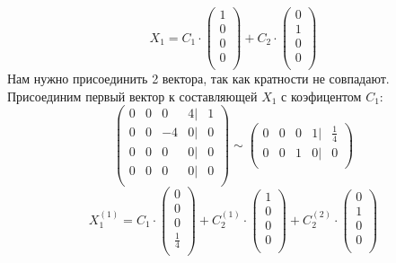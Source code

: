 \documentclass{article}
\begin{document}
\begin{equation*}
    X_1=C_1\cdot 
    \begin{pmatrix}
        1 \\
        0 \\
        0 \\
        0 \\
    \end{pmatrix}+
    C_2
    \cdot
    \begin{pmatrix}
        0 \\
        1 \\
        0 \\
        0 \\
    \end{pmatrix}
\end{equation*}
Нам нужно присоединить 2 вектора, так как кратности не совпадают.\\
Присоединим первый вектор к составляющей $X_1$ с коэфицентом $C_1$:
\begin{equation*}
    \begin{pmatrix}
        0 & 0 & 0 & 4|&1 \\
        0 & 0 & -4 & 0|&0 \\
        0 & 0 & 0 & 0|&0 \\
        0 & 0 & 0 & 0|&0 \\
        \end{pmatrix}\sim 
        \begin{pmatrix}
            0 & 0 & 0 & 1|&\frac{1}{4} \\
            0 & 0 & 1 & 0|&0 \\
        \end{pmatrix}
\end{equation*}
\begin{equation*}
    X^{(1)}_1=C_1\cdot 
    \begin{pmatrix}
        0 \\
        0 \\
        0 \\
        \frac{1}{4} \\
    \end{pmatrix}+
    C^{(1)}_2\cdot 
    \begin{pmatrix}
        1 \\
        0 \\
        0 \\
        0 \\
    \end{pmatrix}+
    C^{(2)}_2\cdot 
    \begin{pmatrix}
        0 \\
        1 \\
        0 \\
        0 \\
    \end{pmatrix}
\end{equation*}
\end{document}
